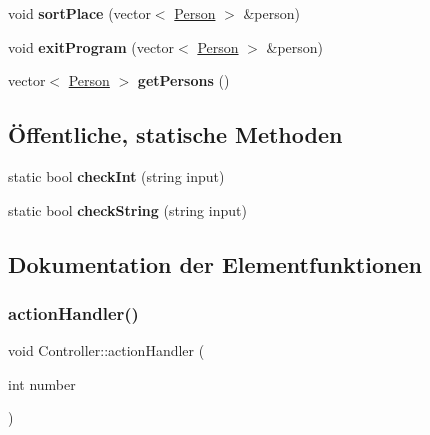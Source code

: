 \begin{DoxyCompactItemize}
\item 
\mbox{\label{classContactManager_1_1Controller_acceb277521fa46c74131b41c937e0dd4}} 
void {\bfseries sort\+Place} (vector$<$ \hyperlink{classContactManager_1_1Person}{Person} $>$ \&person)
\item 
\mbox{\label{classContactManager_1_1Controller_a5c039c4de9d2bb309b6c212c162b115c}} 
void {\bfseries exit\+Program} (vector$<$ \hyperlink{classContactManager_1_1Person}{Person} $>$ \&person)
\item 
\mbox{\label{classContactManager_1_1Controller_a487e6797ca3e968830fea9e0cd8d8faa}} 
vector$<$ \hyperlink{classContactManager_1_1Person}{Person} $>$ {\bfseries get\+Persons} ()
\end{DoxyCompactItemize}
\subsection*{Öffentliche, statische Methoden}
\begin{DoxyCompactItemize}
\item 
\mbox{\label{classContactManager_1_1Controller_a9228c2d2d075707af32f9cceded67566}} 
static bool {\bfseries check\+Int} (string input)
\item 
\mbox{\label{classContactManager_1_1Controller_a409958c7f170c9e269e258bb5a4483e2}} 
static bool {\bfseries check\+String} (string input)
\end{DoxyCompactItemize}


\subsection{Dokumentation der Elementfunktionen}
\mbox{\label{classContactManager_1_1Controller_afd2e274df3edef5ab0abf90aae5ad21c}} 
\subsubsection{\texorpdfstring{action\+Handler()}{actionHandler()}}
{\footnotesize\ttfamily void Controller\+::action\+Handler (\begin{DoxyParamCaption}\item[{int}]{number }\end{DoxyParamCaption})}



